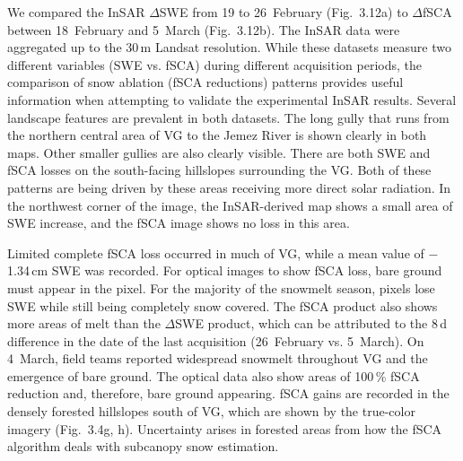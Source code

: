 We compared the InSAR $\Delta$SWE from 19 to 26~February (Fig.~3.12a) to $\Delta$fSCA between 18~February and 5~March (Fig.~3.12b). The InSAR data were aggregated up to the 30\,m Landsat resolution. While these datasets measure two different variables (SWE vs. fSCA) during different acquisition periods, the comparison of snow ablation (fSCA reductions) patterns provides useful information when attempting to validate the experimental InSAR results. Several landscape features are prevalent in both datasets. The long gully that runs from the northern central area of VG to the Jemez River is shown clearly in both maps. Other smaller gullies are also clearly visible. There are both SWE and fSCA losses on the south-facing hillslopes surrounding the VG. Both of these patterns are being driven by these areas receiving more direct solar radiation. In the northwest corner of the image, the InSAR-derived map shows a small area of SWE increase, and the fSCA image shows no loss in this area.

Limited complete fSCA loss occurred in much of VG, while a mean value of $-$1.34\,cm SWE was recorded. For optical images to show fSCA loss, bare ground must appear in the pixel. For the majority of the snowmelt season, pixels lose SWE while still being completely snow covered. The fSCA product also shows more areas of melt than the $\Delta$SWE product, which can be attributed to the 8\,d difference in the date of the last acquisition (26~February vs. 5~March). On 4~March, field teams reported widespread snowmelt throughout VG and the emergence of bare ground. The optical data also show areas of 100\,\% fSCA reduction and, therefore, bare ground appearing. fSCA gains are recorded in the densely forested hillslopes south of VG, which are shown by the true-color imagery (Fig.~3.4g, h). Uncertainty arises in forested areas from how the fSCA algorithm deals with subcanopy snow estimation.

